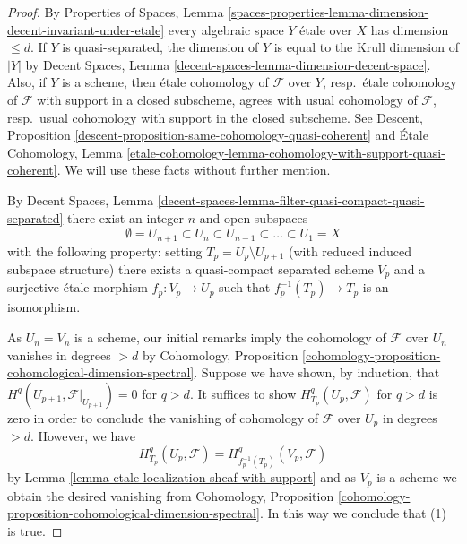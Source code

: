 \begin{proof}
By Properties of Spaces, Lemma
\ref{spaces-properties-lemma-dimension-decent-invariant-under-etale}
every algebraic space $Y$ \'etale over $X$ has dimension $\leq d$.
If $Y$ is quasi-separated, the dimension of $Y$ is equal to the
Krull dimension of $|Y|$ by 
Decent Spaces, Lemma \ref{decent-spaces-lemma-dimension-decent-space}.
Also, if $Y$ is a scheme, then \'etale cohomology of $\mathcal{F}$
over $Y$, resp.\ \'etale cohomology of $\mathcal{F}$ with support in a
closed subscheme, agrees with usual cohomology of $\mathcal{F}$,
resp.\ usual cohomology with support in the closed subscheme.
See
Descent, Proposition \ref{descent-proposition-same-cohomology-quasi-coherent}
and
\'Etale Cohomology, Lemma
\ref{etale-cohomology-lemma-cohomology-with-support-quasi-coherent}.
We will use these facts without further mention.

\medskip\noindent
By Decent Spaces, Lemma
\ref{decent-spaces-lemma-filter-quasi-compact-quasi-separated}
there exist an integer $n$ and open subspaces
$$
\emptyset = U_{n + 1} \subset
U_n \subset U_{n - 1} \subset \ldots \subset U_1 = X
$$
with the following property: setting $T_p = U_p \setminus U_{p + 1}$
(with reduced induced subspace structure) there exists a quasi-compact
separated scheme $V_p$ and a surjective \'etale morphism $f_p : V_p \to U_p$
such that $f_p^{-1}(T_p) \to T_p$ is an isomorphism.

\medskip\noindent
As $U_n = V_n$ is a scheme, our initial remarks imply the cohomology of
$\mathcal{F}$ over $U_n$ vanishes in degrees $> d$ by
Cohomology, Proposition
\ref{cohomology-proposition-cohomological-dimension-spectral}.
Suppose we have shown, by induction, that
$H^q(U_{p + 1}, \mathcal{F}|_{U_{p + 1}}) = 0$ for $q > d$.
It suffices to show $H_{T_p}^q(U_p, \mathcal{F})$ for
$q > d$ is zero in order to conclude the vanishing of cohomology
of $\mathcal{F}$ over $U_p$ in degrees $> d$.
However, we have
$$
H^q_{T_p}(U_p, \mathcal{F}) = H^q_{f_p^{-1}(T_p)}(V_p, \mathcal{F})
$$
by Lemma \ref{lemma-etale-localization-sheaf-with-support}
and as $V_p$ is a scheme we obtain the desired vanishing from
Cohomology, Proposition
\ref{cohomology-proposition-cohomological-dimension-spectral}.
In this way we conclude that (1) is true.


\end{proof}
